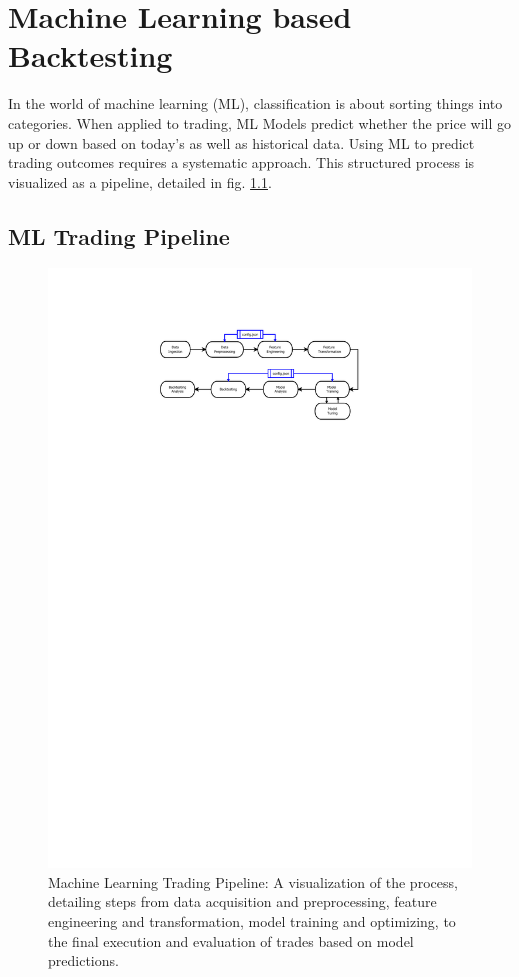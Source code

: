 \chapter{Machine Learning based Backtesting}

In the world of machine learning (ML), classification is about sorting things into categories. When applied to trading, ML Models predict whether the price will go up or down based on today's as well as historical data.
Using ML to predict trading outcomes requires a systematic approach.
This structured process is visualized as a pipeline, detailed in fig. \ref{fig:ml_pipeline}.

\section{ML Trading Pipeline} \label{sec:ml_pipeline}


\begin{figure}[H]
\centering
\includegraphics[trim=25mm 220mm 55mm 30mm, width=1.2\textwidth, clip]{./pdf/ml_pipeline.pdf}
\caption{Machine Learning Trading Pipeline: A visualization of the process, detailing steps from data acquisition and preprocessing, feature engineering and transformation, model training and optimizing, to the final execution and evaluation of trades based on model predictions.}
\label{fig:ml_pipeline}
\end{figure}

